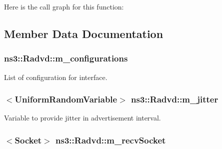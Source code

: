 Here is the call graph for this function\+:




\subsection{Member Data Documentation}
\subsubsection[{\texorpdfstring{m\+\_\+configurations}{m_configurations}}]{ ns3\+::\+Radvd\+::m\+\_\+configurations\hspace{0.3cm}{\ttfamily [private]}}\hypertarget{classns3_1_1Radvd_ad47ced3406790e0b78b5b141e0568aa9}{}\label{classns3_1_1Radvd_ad47ced3406790e0b78b5b141e0568aa9}


List of configuration for interface. 

\subsubsection[{\texorpdfstring{m\+\_\+jitter}{m_jitter}}]{$<${\bf Uniform\+Random\+Variable}$>$ ns3\+::\+Radvd\+::m\+\_\+jitter\hspace{0.3cm}{\ttfamily [private]}}\hypertarget{classns3_1_1Radvd_a14f71f3c45656a0280d512cb1b148839}{}\label{classns3_1_1Radvd_a14f71f3c45656a0280d512cb1b148839}


Variable to provide jitter in advertisement interval. 

\subsubsection[{\texorpdfstring{m\+\_\+recv\+Socket}{m_recvSocket}}]{$<${\bf Socket}$>$ ns3\+::\+Radvd\+::m\+\_\+recv\+Socket\hspace{0.3cm}{\ttfamily [private]}}\hypertarget{classns3_1_1Radvd_a6449329450cd38a098db2cf2cb91d64e}{}\label{classns3_1_1Radvd_a6449329450cd38a098db2cf2cb91d64e}


